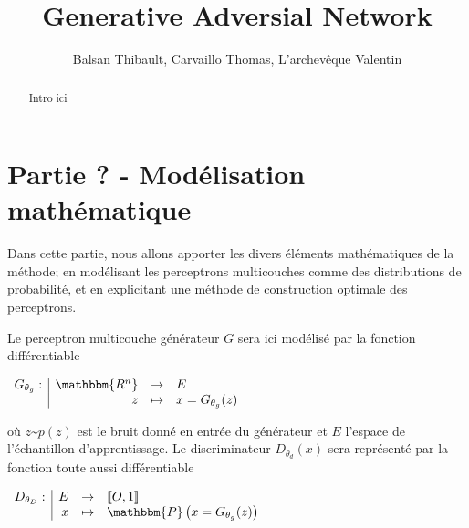 \documentclass[letterpaper]{oup-contemporary}
\title{Generative Adversial Network}
\author[1]{Balsan Thibault, Carvaillo Thomas, L'archevêque Valentin}
\newcommand{\fonction}[5]{\begin{array}{l|rcl}
    #1: & #2 & \rightarrow & #3 \\
        & #4 & \mapsto & #5 \end{array}}
\begin{document}
\begin{frontmatter}
\maketitle
\begin{abstract}
Intro ici
\end{abstract}
\end{frontmatter}



\section{Partie ? - Modélisation mathématique}
Dans cette partie, nous allons apporter les divers éléments mathématiques de la méthode; en modélisant les perceptrons multicouches comme des distributions de probabilité, et en explicitant une méthode de construction optimale des perceptrons.\newline

Le perceptron multicouche générateur $G$ sera ici modélisé par la fonction différentiable  

\begin{center}
    $\fonction{G_{\theta_g}}{\mathbbm{R^n}}{E}{z}{x = G_{\theta_g}(z)}$
\end{center}

où $z \text{\textasciitilde} p(z)$ est le bruit donné en entrée du générateur et $E$ l'espace de l'échantillon d'apprentissage.\newline
Le discriminateur $D_{\theta_d}(x)$ sera représenté par la fonction toute aussi différentiable

\begin{center}
    $\fonction{D_{\theta_D}}{E}{\llbracket O,1 \rrbracket}{x}{\mathbbm{P}\left(x = G_{\theta_g}(z)\right)}$
\end{center}
\end{document}
